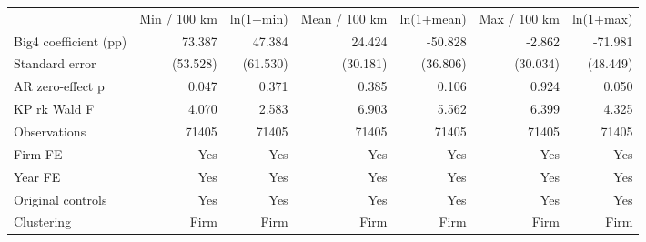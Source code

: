 \begin{tabular}{lrrrrrr}
\hline
 & Min / 100 km & ln(1+min) & Mean / 100 km & ln(1+mean) & Max / 100 km & ln(1+max) \\
Big4 coefficient (pp) & 73.387 & 47.384 & 24.424 & -50.828 & -2.862 & -71.981 \\
Standard error & (53.528) & (61.530) & (30.181) & (36.806) & (30.034) & (48.449) \\
AR zero-effect p & 0.047 & 0.371 & 0.385 & 0.106 & 0.924 & 0.050 \\
KP rk Wald F & 4.070 & 2.583 & 6.903 & 5.562 & 6.399 & 4.325 \\
Observations & 71405 & 71405 & 71405 & 71405 & 71405 & 71405 \\
Firm FE & Yes & Yes & Yes & Yes & Yes & Yes \\
Year FE & Yes & Yes & Yes & Yes & Yes & Yes \\
Original controls & Yes & Yes & Yes & Yes & Yes & Yes \\
Clustering & Firm & Firm & Firm & Firm & Firm & Firm \\
\hline
\end{tabular}
